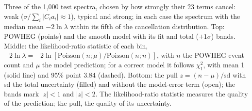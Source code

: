 \caption{Three of the 1{,}000 test spectra, chosen by how strongly their 23 terms cancel:
weak ($\sigma/\sum_i|C_ia_i| \approx 1$), typical and strong; in each case the spectrum with the
median mean $-2\ln\lambda$ within its fifth of the cancellation distribution.
Top: POWHEG (points) and the smooth model with its fit and total ($\pm1\sigma$) bands.
Middle: the likelihood-ratio statistic of each bin,
$-2\ln\lambda = -2\ln[\mathrm{Poisson}(n;\mu)/\mathrm{Poisson}(n;n)]$, with $n$ the POWHEG event count and
$\mu$ the model prediction; for a correct model it follows $\chi^2_1$, with mean 1 (solid line)
and 95\% point 3.84 (dashed).
Bottom: the pull $z = (n-\mu)/\mathrm{sd}$ with sd the total uncertainty (filled) and without the
model-error term (open); the bands mark $|z|<1$ and $|z|<2$.
The likelihood-ratio statistic measures the quality of the prediction; the pull, the quality of its uncertainty.}
